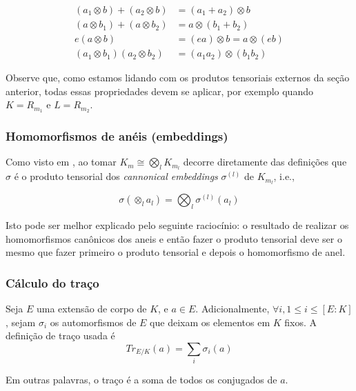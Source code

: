 \begin{equation}
    \label{eq:four_operations}
    \begin{split}
        (a_1 \otimes b) + (a_2 \otimes b) &= (a_1 + a_2) \otimes b \\
        (a \otimes b_1) + (a \otimes b_2) &= a \otimes (b_1 + b_2) \\
        e (a \otimes b) &= (ea) \otimes b = a \otimes (eb) \\
        (a_1 \otimes b_1) (a_2 \otimes b_2) &= (a_1 a_2) \otimes (b_1 b_2)
    \end{split}
    \end{equation}
    
Observe que, como estamos lidando com os produtos tensoriais externos da seção anterior, todas essas propriedades devem se aplicar, por exemplo quando $K = R_{m_1}$ e $L = R_{m_2}$.

\subsubsection{Homomorfismos de anéis (embeddings)}
Como visto em \cite{lyubashevsky2013}, ao tomar $K_m \cong \bigotimes_l K_{m_l}$ decorre diretamente das definições que $\sigma$ é o produto tensorial
dos \textit{cannonical embeddings} $\sigma^{(l)}$ de $K_{m_l}$, i.e.,

\begin{equation}\label{eq:ring_embeddings}
    \sigma(\otimes_l a_l) = \bigotimes_l \sigma^{(l)}(a_l)
\end{equation}

Isto pode ser melhor explicado pelo seguinte raciocínio: o resultado de realizar os homomorfismos canônicos dos aneis e então fazer o produto tensorial deve ser
o mesmo que fazer primeiro o produto tensorial e depois o homomorfismo de anel.

\subsubsection{Cálculo do traço}

Seja $E$ uma extensão de corpo de $K$, e $a \in E$. Adicionalmente, $\forall i, 1 \leq i \leq [E:K]$, sejam $\sigma_i$ os automorfismos de $E$ que deixam os elementos em $K$ fixos. A definição de traço usada é
\begin{equation}
    Tr_{E/K}(a) = \sum_i \sigma_i(a)
\end{equation}

Em outras palavras, o traço é a soma de todos os conjugados de $a$.

